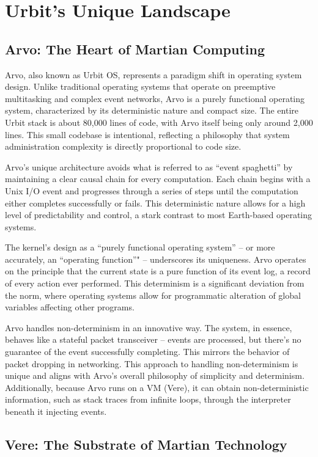 \documentclass[twoside]{article}
\begin{document}
\section{Urbit's Unique Landscape}

\subsection{Arvo: The Heart of Martian Computing}
Arvo, also known as Urbit OS, represents a paradigm shift in operating system design.
Unlike traditional operating systems that operate on preemptive multitasking and complex event networks, Arvo is a purely functional operating system, characterized by its deterministic nature and compact size. 
The entire Urbit stack is about 80,000 lines of code, with Arvo itself being only around 2,000 lines. 
This small codebase is intentional, reflecting a philosophy that system administration complexity is directly proportional to code size.

Arvo's unique architecture avoids what is referred to as ``event spaghetti'' by maintaining a clear causal chain for every computation. 
Each chain begins with a Unix I/O event and progresses through a series of steps until the computation either completes successfully or fails.
This deterministic nature allows for a high level of predictability and control, a stark contrast to most Earth-based operating systems.

The kernel's design as a ``purely functional operating system'' – or more accurately, an ``operating function''" – underscores its uniqueness.
Arvo operates on the principle that the current state is a pure function of its event log, a record of every action ever performed.
This determinism is a significant deviation from the norm, where operating systems allow for programmatic alteration of global variables affecting other programs.

Arvo handles non-determinism in an innovative way. 
The system, in essence, behaves like a stateful packet transceiver -- events are processed, but there's no guarantee of the event successfully completing.
This mirrors the behavior of packet dropping in networking.
This approach to handling non-determinism is unique and aligns with Arvo's overall philosophy of simplicity and determinism.
Additionally, because Arvo runs on a VM (Vere), it can obtain non-deterministic information, such as stack traces from infinite loops, through the interpreter beneath it injecting events.

\subsection{Vere: The Substrate of Martian Technology}
\end{document}

